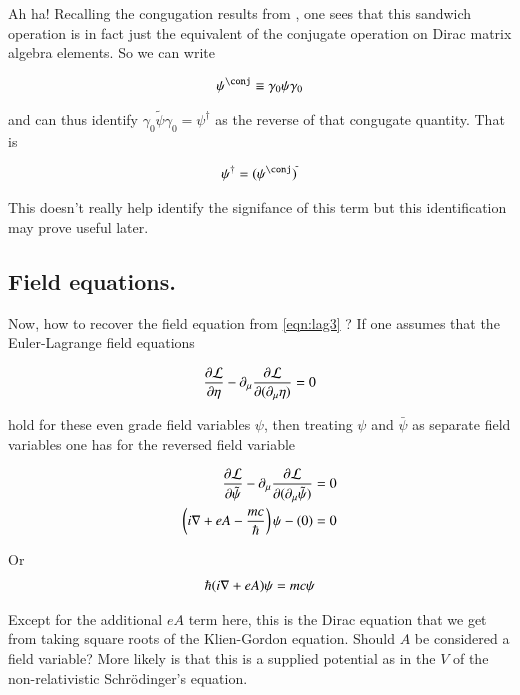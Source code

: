 \documentclass{article}
\begin{document}
Ah ha!  Recalling the congugation results from \cite{PJDiracGamma}, one sees that this sandwich operation is in fact just the equivalent of the conjugate operation on Dirac matrix algebra elements.  So we can write

\begin{align*}
\psi^\conj \equiv \gamma_0 \psi \gamma_0
\end{align*}

and can thus identify $\gamma_0 \tilde{\psi} \gamma_0 = \psi^\dagger$ as the reverse of that congugate quantity.  That is

\begin{align*}
\psi^\dagger = (\psi^\conj)^{\tilde{}}
\end{align*}

This doesn't really help identify the signifance of this term but this identification may prove useful later.

\subsection{ Field equations. }

Now, how to recover the field equation from \ref{eqn:lag3} 
?  If one assumes that the Euler-Lagrange field equations

\begin{align*}
\frac{\partial {\mathcal{L}}}{\partial {\eta}} - \partial_\mu \frac{\partial {\mathcal{L}}}{\partial {(\partial_\mu \eta)}} = 0
\end{align*}

hold for these even grade field variables $\psi$, then treating $\psi$ and $\bar \psi$ as separate field variables one has for the reversed field variable

\begin{align*}
\frac{\partial {\mathcal{L}}}{\partial {\tilde{\psi}}} - \partial_\mu \frac{\partial {\mathcal{L}}}{\partial {(\partial_\mu \tilde{\psi})}} &= 0 \\
\left( i \nabla + e A - \frac{mc}{\hbar}\right) \psi - (0) &= 0
\end{align*}

Or 
\begin{align*}
\hbar (i \nabla + e A) \psi = mc \psi
\end{align*}

Except for the additional $e A$ term here, this is the Dirac equation that we get from taking square roots of the Klien-Gordon equation.  Should $A$ be considered a field variable?  More likely is that this is a supplied potential as in the $V$ of the non-relativistic 
Schr\"{o}dinger's equation.
\end{document}
